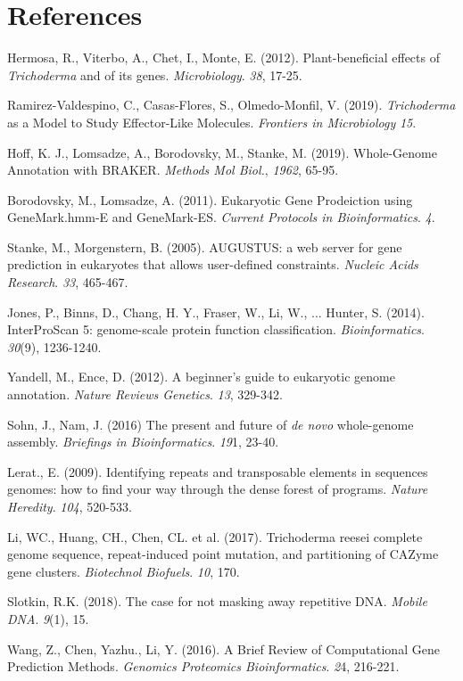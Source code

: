 \documentclass[12pt]{article}
\begin{document}
\section{References}

\begin{thebibliography}{99}
 Hermosa, R., Viterbo, A., Chet, I., Monte,
  E. (2012). Plant-beneficial effects of \textit{Trichoderma} and of
  its genes. \textit{Microbiology}. \textit{38},
  17-25. 

 Ramirez-Valdespino, C., Casas-Flores, S.,
  Olmedo-Monfil, V. (2019). \textit{Trichoderma} as a Model to Study
  Effector-Like Molecules. \textit{Frontiers in Microbiology} \textit{15}.

 Hoff, K. J., Lomsadze, A., Borodovsky, M., 
  Stanke, M. (2019). Whole-Genome Annotation with
  BRAKER. \textit{Methods Mol Biol.}, \textit{1962}, 65-95.

 Borodovsky, M., Lomsadze, A. (2011). Eukaryotic
  Gene Prodeiction using GeneMark.hmm-E and
  GeneMark-ES. \textit{Current Protocols in
    Bioinformatics}. \textit{4}.

 Stanke, M., Morgenstern, B. (2005). AUGUSTUS: a web
  server for gene prediction in eukaryotes that allows user-defined
  constraints. \textit{Nucleic Acids Research}. \textit{33}, 465-467.
  
 Jones, P., Binns, D., Chang, H. Y., Fraser,
  W., Li, W., ... Hunter, S. (2014). InterProScan 5: genome-scale
  protein function
  classification. \textit{Bioinformatics}. \textit{30}(9),
  1236-1240.

 Yandell, M., Ence, D. (2012). A beginner's
  guide to eukaryotic genome annotation. \textit{Nature Reviews
    Genetics}. \textit{13}, 329-342.
  
 Sohn, J., Nam, J. (2016) The present and future of
  \textit{de novo} whole-genome assembly. \textit{Briefings in
    Bioinformatics}. \textit{19}1, 23-40.

 Lerat., E. (2009). Identifying repeats and
  transposable elements in sequences genomes: how to find your way
  through the dense forest of programs. \textit{Nature
    Heredity}. \textit{104}, 520-533.

 Li, WC., Huang, CH., Chen, CL. et
  al. (2017). Trichoderma reesei complete genome sequence,
  repeat-induced point mutation, and partitioning of CAZyme gene
  clusters. \textit{Biotechnol Biofuels}. \textit{10}, 170.

 Slotkin, R.K. (2018). The case for not masking away
  repetitive DNA. \textit{Mobile DNA}. \textit{9}(1), 15.
  
 Wang, Z., Chen, Yazhu., Li, Y. (2016). A Brief
  Review of Computational Gene Prediction Methods. \textit{Genomics
    Proteomics Bioinformatics}. \textit{2}4, 216-221.
  
\end{thebibliography}
\end{document}
